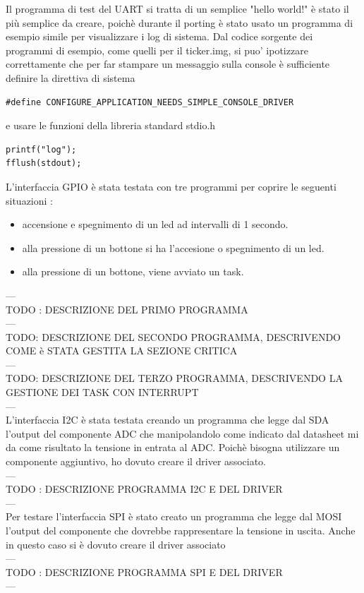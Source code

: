 \documentclass[12pt, a4paper, titlepage, oneside]{book}
\begin{document}
\begin{flushleft}
Il programma di test del UART si tratta di un semplice "hello world!" è stato il più semplice da creare, poichè durante il porting è stato usato un programma di esempio simile per visualizzare i log di sistema. Dal codice sorgente dei programmi di esempio, come quelli per il ticker.img,  si puo' ipotizzare correttamente che per far stampare un messaggio sulla console è sufficiente definire la direttiva di sistema 
\begin{lstlisting}
#define CONFIGURE_APPLICATION_NEEDS_SIMPLE_CONSOLE_DRIVER 
\end{lstlisting} 
e usare le funzioni della libreria standard stdio.h 
\begin{lstlisting}
printf("log"); 
fflush(stdout);
\end{lstlisting}
L'interfaccia GPIO è stata testata con tre programmi per coprire le seguenti situazioni :
\begin{itemize}
    \item accensione e spegnimento di un led ad intervalli di 1 secondo.
    \item alla pressione di un bottone si ha l'accesione o spegnimento di un led.
    \item alla pressione di un bottone, viene avviato un task.
\end{itemize}
---\\
TODO : DESCRIZIONE DEL PRIMO PROGRAMMA\\
---\\
TODO: DESCRIZIONE DEL SECONDO PROGRAMMA, DESCRIVENDO COME è STATA GESTITA LA SEZIONE CRITICA\\
---\\
TODO: DESCRIZIONE DEL TERZO PROGRAMMA, DESCRIVENDO LA GESTIONE DEI TASK CON INTERRUPT\\
---\\
L'interfaccia I2C è stata testata creando un programma che legge dal SDA l'output del componente ADC che manipolandolo come indicato dal datasheet mi da come risultato la tensione in entrata al ADC. Poichè bisogna utilizzare un componente aggiuntivo, ho dovuto creare il driver associato.\\
---\\
TODO : DESCRIZIONE PROGRAMMA I2C E DEL DRIVER\\
---\\
Per testare l'interfaccia SPI è stato creato un programma che legge dal MOSI l'output del componente che dovrebbe rappresentare la tensione in uscita. Anche in questo caso si è dovuto creare il driver associato \\
---\\
TODO : DESCRIZIONE PROGRAMMA SPI E DEL DRIVER\\
---\\

\end{flushleft}
\end{document}
